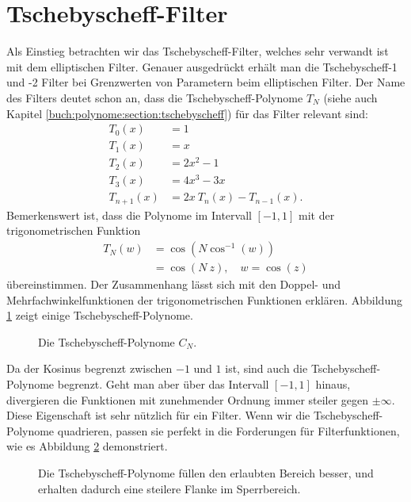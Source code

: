 \section{Tschebyscheff-Filter}

Als Einstieg betrachten wir das Tschebyscheff-Filter, welches sehr verwandt ist mit dem elliptischen Filter.
Genauer ausgedrückt erhält man die Tschebyscheff-1 und -2 Filter bei Grenzwerten von Parametern beim elliptischen Filter.
Der Name des Filters deutet schon an, dass die Tschebyscheff-Polynome $T_N$ (siehe auch Kapitel \ref{buch:polynome:section:tschebyscheff}) für das Filter relevant sind:
\begin{align}
    T_{0}(x)&=1\\
    T_{1}(x)&=x\\
    T_{2}(x)&=2x^{2}-1\\
    T_{3}(x)&=4x^{3}-3x\\
    T_{n+1}(x)&=2x~T_{n}(x)-T_{n-1}(x).
\end{align}
Bemerkenswert ist, dass die Polynome im Intervall $[-1, 1]$ mit der trigonometrischen Funktion
\begin{align} \label{ellfilter:eq:chebychef_polynomials}
    T_N(w) &= \cos \left( N \cos^{-1}(w) \right) \\
           &= \cos \left(N~z \right), \quad w= \cos(z)
\end{align}
übereinstimmen.
Der Zusammenhang lässt sich mit den Doppel- und Mehrfachwinkelfunktionen der trigonometrischen Funktionen erklären.
Abbildung \ref{ellfilter:fig:chebychef_polynomials} zeigt einige Tschebyscheff-Polynome.
\begin{figure}
    \centering
    
    \caption{Die Tschebyscheff-Polynome $C_N$.}
    \label{ellfilter:fig:chebychef_polynomials}
\end{figure}
Da der Kosinus begrenzt zwischen $-1$ und $1$ ist, sind auch die Tschebyscheff-Polynome begrenzt.
Geht man aber über das Intervall $[-1, 1]$ hinaus, divergieren die Funktionen mit zunehmender Ordnung immer steiler gegen $\pm \infty$.
Diese Eigenschaft ist sehr nützlich für ein Filter.
Wenn wir die Tschebyscheff-Polynome quadrieren, passen sie perfekt in die Forderungen für Filterfunktionen, wie es Abbildung \ref{ellfiter:fig:chebychef} demonstriert.
\begin{figure}
    \centering
    
    \caption{Die Tschebyscheff-Polynome füllen den erlaubten Bereich besser, und erhalten dadurch eine steilere Flanke im Sperrbereich.}
    \label{ellfiter:fig:chebychef}
\end{figure}

